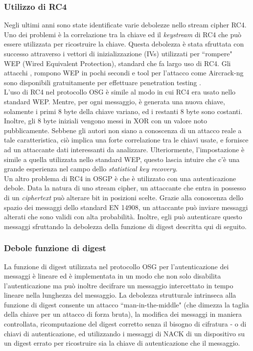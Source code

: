 \subsubsection{Utilizzo di RC4}
Negli ultimi anni sono state identificate varie debolezze nello stream cipher RC4. Uno dei problemi è la correlazione tra la chiave ed il \emph{keystream} di RC4 che può essere utilizzata per ricostruire la chiave. Questa debolezza è stata sfruttata con successo attraverso i vettori di inizializzazione (IVs)  utilizzati per ``rompere" WEP (Wired Equivalent Protection), standard che fa largo uso di RC4. Gli attacchi \cite{wep1}, \cite{wep2} rompono WEP in pochi secondi e tool per l'attacco come Aircrack-ng \cite{aircrackng} sono disponibili gratuitamente per effettuare penetration testing \cite{kali}.\\
L'uso di RC4 nel protocollo OSG è simile al modo in cui RC4 era usato nello standard WEP. Mentre, per ogni messaggio, è generata una nuova chiave, solamente i primi 8 byte della chiave variano, ed i restanti 8 byte sono costanti. Inoltre, gli 8 byte iniziali vengono messi in XOR con un valore noto pubblicamente. Sebbene gli autori non siano a conoscenza di un attacco reale a tale caratteristica, ciò implica una forte correlazione tra le chiavi usate, e fornisce ad un attaccante dati interessanti da analizzare. Ulteriormente, l'impostazione è simile a quella utilizzata nello standard WEP, questo lascia intuire che c'è una grande esperienza nel campo dello \emph{statistical key recovery}.\\
Un altro problema di RC4 in OSGP è che è utilizzato con una autenticazione debole. Data la natura di uno stream cipher, un attaccante che entra in possesso di un \emph{ciphertext} può alterare bit in posizioni scelte. Grazie alla conoscenza dello spazio dei messaggi dello standard EN 14908, un attaccante può inviare messaggi alterati che sono validi con alta probabilità. Inoltre, egli può autenticare questo messaggi sfruttando la debolezza della funzione di digest descritta qui di seguito.
\subsubsection{Debole funzione di digest}
La funzione di digest utilizzata nel protocollo OSG per l'autenticazione dei messaggi è lineare ed è implementata in un modo che non solo disabilita l'autenticazione ma può inoltre decifrare un messaggio intercettato in tempo lineare nella lunghezza del messaggio. La debolezza strutturale intrinseca alla funzione di digest consente un attacco ``man-in-the-middle" (che dimezza la taglia della chiave per un attacco di forza bruta), la modifica dei messaggi in maniera controllata, ricomputazione del digest corretto senza il bisogno di cifratura - o di chiavi di autenticazione, ed utilizzando i messaggi di NACK di un dispositivo su un digest errato per ricostruire sia la chiave di autenticazione che il messaggio.
